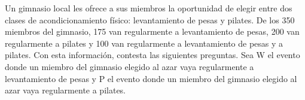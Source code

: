 \question[20] Un gimnasio local les ofrece a sus miembros la oportunidad de elegir entre dos clases de
acondicionamiento físico: levantamiento de pesas y pilates. De los 350 miembros del gimnasio, 175 van regularmente
a levantamiento de pesas, 200 van regularmente a pilates y 100 van regularmente a levantamiento de pesas
y a pilates. Con esta información, contesta las siguientes preguntas.
Sea W el evento donde un miembro del gimnasio elegido al azar vaya regularmente a levantamiento de pesas y P
el evento donde un miembro del gimnasio elegido al azar vaya regularmente a pilates.
